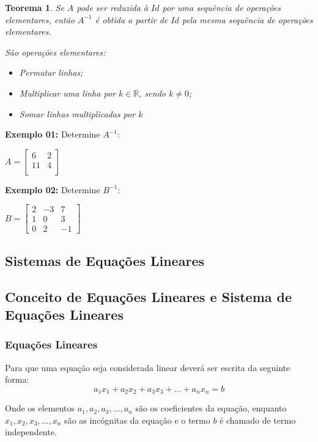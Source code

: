 \documentclass[oneside,a4paper,12pt]{article}
\newtheorem{theorem}{Teorema}[section]
\begin{document}
\begin{theorem}
	Se $A$ pode ser reduzida à $Id$ por uma sequência de operações elementares, então $A^{-1}$ é obtida a partir de $Id$ pela mesma sequência de operações elementares.
	
	São operações elementares:
	\begin{itemize}
		\item Permutar linhas;
		\item Multiplicar uma linha por $k \in \mathbb{R}$, sendo $k \neq 0$;
		\item Somar linhas multiplicadas por $k$
	\end{itemize}
\end{theorem}


\textbf{Exemplo 01:} Determine $A^{-1}$:

$A=\left[
\begin{array}{cc}
6	&	2	\\
11	&	4	\\
\end{array}
\right]
$
\vspace{200pt}	

\textbf{Exemplo 02:} Determine $B^{-1}$:

$B=\left[
\begin{array}{ccc}
2	&	-3	&	7	\\
1	&	0	&	3	\\
0	&	2	&	-1
\end{array}
\right]
$
\newpage

\newpage
\begin{snugshade}
	\section{Sistemas de Equações Lineares}
\end{snugshade}

\subsection{Conceito de Equações Lineares e Sistema de Equações Lineares}

\subsubsection{Equações Lineares}

Para que uma equação seja considerada linear deverá ser escrita da seguinte forma:
$$a_1x_1+a_2x_2+a_3x_3+\dots+a_nx_n=b$$

Onde os elementos $a_1,a_2,a_3,\dots,a_n$ são os coeficientes da equação, enquanto $x_1,x_2,x_3,\dots,x_n$ são as incógnitas da equação e o termo $b$ é chamado de termo independente.
\end{document}
